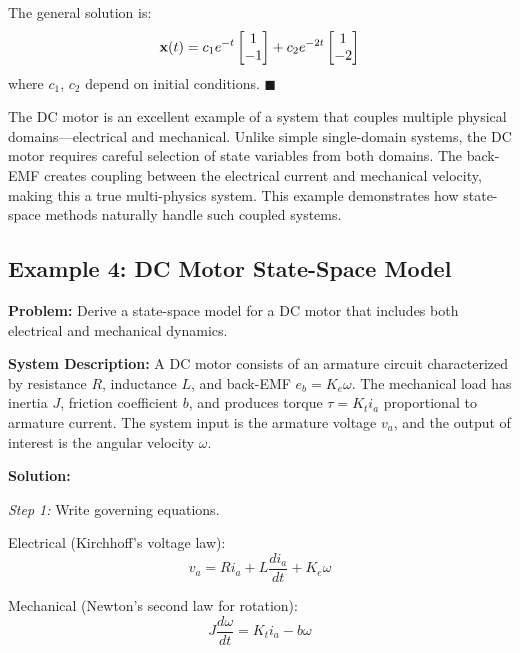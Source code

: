 The general solution is:
\begin{equation}
    \mathbf{x}(t) = c_1 e^{-t}\begin{bmatrix} 1 \\ -1 \end{bmatrix} +
    c_2 e^{-2t}\begin{bmatrix} 1 \\ -2 \end{bmatrix}
\end{equation}
where $c_1$, $c_2$ depend on initial conditions. \hfill $\blacksquare$

\begin{examplebox}
The DC motor is an excellent example of a system that couples multiple physical domains---electrical and mechanical. Unlike simple single-domain systems, the DC motor requires careful selection of state variables from both domains. The back-EMF creates coupling between the electrical current and mechanical velocity, making this a true multi-physics system. This example demonstrates how state-space methods naturally handle such coupled systems.
\end{examplebox}

\subsection{Example 4: DC Motor State-Space Model}

\textbf{Problem:} Derive a state-space model for a DC motor that includes both electrical and mechanical dynamics.

\textbf{System Description:}
A DC motor consists of an armature circuit characterized by resistance $R$, inductance $L$, and back-EMF $e_b = K_e\omega$. The mechanical load has inertia $J$, friction coefficient $b$, and produces torque $\tau = K_t i_a$ proportional to armature current. The system input is the armature voltage $v_a$, and the output of interest is the angular velocity $\omega$.

\textbf{Solution:}

\textit{Step 1:} Write governing equations.

Electrical (Kirchhoff's voltage law):
\begin{equation}
    v_a = Ri_a + L\frac{di_a}{dt} + K_e\omega
\end{equation}

Mechanical (Newton's second law for rotation):
\begin{equation}
    J\frac{d\omega}{dt} = K_t i_a - b\omega
\end{equation}

